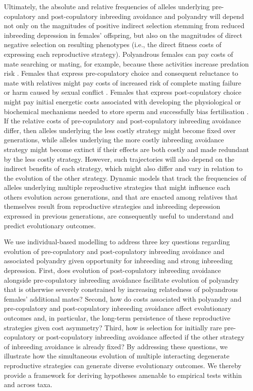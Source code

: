 \documentclass[10pt,letterpaper]{article}
\begin{document}
Ultimately, the absolute and relative frequencies of alleles underlying pre-copulatory and post-copulatory inbreeding avoidance and polyandry will depend not only on the magnitudes of positive indirect selection stemming from reduced inbreeding depression in females' offspring, but also on the magnitudes of direct negative selection on resulting phenotypes (i.e., the direct fitness costs of expressing each reproductive strategy). Polyandrous females can pay costs of mate searching or mating, for example, because these activities increase predation risk \cite[e.g.,][]{Rowe1988, Ronkainen1994, Koga1998}. Females that express pre-copulatory choice and consequent reluctance to mate with relatives might pay costs of increased risk of complete mating failure or harm caused by sexual conflict \cite[][]{Rowe1994, Kokko2013}. Females that express post-copulatory choice might pay initial energetic costs associated with developing the physiological or biochemical mechanisms needed to store sperm and successfully bias fertilisation \cite[e.g.,][]{Gasparini2011, Tuni2013, Fitzpatrick2014b}. If the relative costs of pre-copulatory and post-copulatory inbreeding avoidance differ, then alleles underlying the less costly strategy might become fixed over generations, while alleles underlying the more costly inbreeding avoidance strategy might become extinct if their effects are both costly and made redundant by the less costly strategy. However, such trajectories will also depend on the indirect benefits of each strategy, which might also differ and vary in relation to the evolution of the other strategy. Dynamic models that track the frequencies of alleles underlying multiple reproductive strategies that might influence each others evolution across generations, and that are enacted among relatives that themselves result from reproductive strategies and inbreeding depression expressed in previous generations, are consequently useful to understand and predict evolutionary outcomes.

We use individual-based modelling to address three key questions regarding evolution of pre-copulatory and post-copulatory inbreeding avoidance and associated polyandry given opportunity for inbreeding and strong inbreeding depression. First, does evolution of post-copulatory inbreeding avoidance alongside pre-copulatory inbreeding avoidance facilitate evolution of polyandry that is otherwise severely constrained by increasing relatedness of polyandrous females' additional mates? Second, how do costs associated with polyandry and pre-copulatory and post-copulatory inbreeding avoidance affect evolutionary outcomes and, in particular, the long-term persistence of these reproductive strategies given cost asymmetry? Third, how is selection for initially rare pre-copulatory or post-copulatory inbreeding avoidance affected if the other strategy of inbreeding avoidance is already fixed? By addressing these questions, we illustrate how the simultaneous evolution of multiple interacting degenerate reproductive strategies can generate diverse evolutionary outcomes. We thereby provide a framework for deriving hypotheses amenable to empirical tests within and across taxa.
\end{document}
